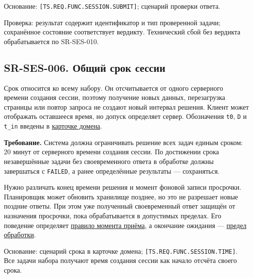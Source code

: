 \documentclass[12pt,a4paper]{article}
\begin{document}
Основание: \texttt{[TS.\allowbreak{}REQ.\allowbreak{}FUNC.\allowbreak{}SESSION.\allowbreak{}SUBMIT]}; сценарий проверки ответа.

Проверка: результат содержит идентификатор и тип проверенной задачи; сохранённое состояние соответствует вердикту. Технический сбой без вердикта обрабатывается по SR-SES-010.

\subsection{SR-SES-006. Общий срок сессии}\label{sr-ses-006-ux43eux431ux449ux438ux439-ux441ux440ux43eux43a-ux441ux435ux441ux441ux438ux438}

\hypertarget{sr-ses-006-общий-срок-сессии}{}

Срок относится ко всему набору. Он отсчитывается от одного серверного времени создания сессии, поэтому получение новых данных, перезагрузка страницы или повтор запроса не создают новый интервал решения. Клиент может отображать оставшееся время, но допуск определяет сервер. Обозначения \texttt{t0}, \texttt{D} и \texttt{t\_in} введены в \href{../notes/domains/\%D0\%A1\%D0\%B5\%D1\%81\%D1\%81\%D0\%B8\%D0\%B8_\%D0\%B7\%D0\%B0\%D0\%B4\%D0\%B0\%D1\%87.pdf\#nameddest=\%D1\%81\%D1\%80\%D0\%BE\%D0\%BA-\%D0\%B8-\%D0\%BF\%D0\%BE\%D0\%BF\%D1\%8B\%D1\%82\%D0\%BA\%D0\%B0}{карточке домена}.

\textbf{Требование.} Система должна ограничивать решение всех задач единым сроком: 20 минут от серверного времени создания сессии. По достижении срока незавершённые задачи без своевременного ответа в обработке должны завершаться с \texttt{FAILED}, а ранее определённые результаты --- сохраняться.

Нужно различать конец времени решения и момент фоновой записи просрочки. Планировщик может обновить хранилище позднее, но это не разрешает новые поздние ответы. При этом уже полученный своевременный ответ защищён от назначения просрочки, пока обрабатывается в допустимых пределах. Его поведение определяет \hyperref[sr-ses-011-ux43cux43eux43cux435ux43dux442-ux43fux440ux438ux451ux43cux430-ux43eux442ux432ux435ux442ux430]{правило момента приёма}, а окончание ожидания --- \hyperref[sr-ses-012-ux43eux433ux440ux430ux43dux438ux447ux435ux43dux43dux430ux44f-ux434ux43bux438ux442ux435ux43bux44cux43dux43eux441ux442ux44c-ux43eux431ux440ux430ux431ux43eux442ux43aux438]{предел обработки}.

Основание: сценарий срока в карточке домена; \texttt{[TS.\allowbreak{}REQ.\allowbreak{}FUNC.\allowbreak{}SESSION.\allowbreak{}TIME]}. Все задачи набора получают время создания сессии как начало отсчёта своего срока.
\end{document}
